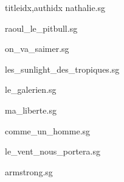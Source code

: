\documentclass[
    ]{article}
\begin{document}
\begin{songs}{titleidx,authidx}
{nathalie.sg}


{raoul_le_pitbull.sg}


{on_va_saimer.sg}


{les_sunlight_des_tropiques.sg}


{le_galerien.sg}


{ma_liberte.sg}


{comme_un_homme.sg}


{le_vent_nous_portera.sg}


{armstrong.sg}



\end{songs}
\end{document}
